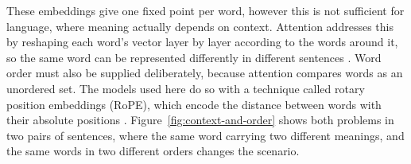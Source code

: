 These embeddings give one fixed point per word, however this is not sufficient for language, where meaning actually depends on context. Attention addresses this by reshaping each word's vector layer by layer according to the words around it, so the same word can be represented differently in different sentences \cite{devlin2019bertpretrainingdeepbidirectional}. Word order must also be supplied deliberately, because attention compares words as an unordered set. The models used here do so with a technique called rotary position embeddings (RoPE), which encode the distance between words with their absolute positions \cite{su2023roformerenhancedtransformerrotary}. Figure~\ref{fig:context-and-order} shows both problems in two pairs of sentences, where the same word carrying two different meanings, and the same words in two different orders changes the scenario.

